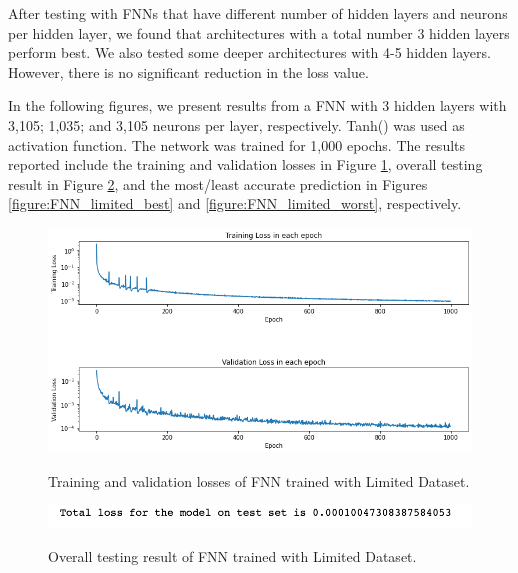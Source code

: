After testing with FNNs that have different number of hidden layers and neurons per hidden layer, we found that architectures with a total number 3 hidden layers perform best. We also tested some deeper architectures with 4-5 hidden layers. However, there is no significant reduction in the loss value.

In the following figures, we present results from a FNN with 3 hidden layers with 3,105; 1,035; and 3,105 neurons per layer, respectively. Tanh() was used as activation function. The network was trained for 1,000 epochs. The results reported include the training and validation losses in Figure \ref{figure:FNN_limited_losses}, overall testing result in Figure \ref{figure:FNN_limited_testing}, and the most/least accurate prediction in Figures \ref{figure:FNN_limited_best} and \ref{figure:FNN_limited_worst}, respectively.

\begin{figure}[H]
    \caption{Training and validation losses of FNN trained with Limited Dataset.}
    \includegraphics[scale=0.6]{figures/mantle_convection_images/limited_dataset/FNN_trainingData.png}
    \label{figure:FNN_limited_losses}
\end{figure}

\begin{figure}[H]
    \caption{Overall testing result of FNN trained with Limited Dataset.}
    \includegraphics[scale=0.8]{figures/mantle_convection_images/limited_dataset/FNN_OverallTesting.png}
    \label{figure:FNN_limited_testing}
\end{figure}

